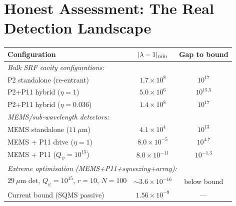 \documentclass[11pt,twocolumn]{article}
\newcommand{\lam}{\lambda}
\newcommand{\ee}[1]{\times 10^{#1}}
\newcommand{\Qpsi}{Q_\psi}
\theoremstyle{definition}
\theoremstyle{remark}
\begin{document}
\section{Honest Assessment: The Real Detection Landscape}
\label{sec:honest}

\begin{tcolorbox}[colback=blue!5!white, colframe=blue!50!black,
  title=\textbf{Summary: P2 Detection Capabilities vs.\ Current Bound}]

\begin{center}
\renewcommand{\arraystretch}{1.3}
\begin{tabular}{@{}p{4cm}cc@{}}
\toprule
Configuration & $|\lam-1|_{\rm min}$ & Gap to bound \\
\midrule
\multicolumn{3}{l}{\textit{Bulk SRF cavity configurations:}} \\
P2 standalone (re-entrant) & $1.7\ee{8}$ & $10^{17}$ \\
P2+P11 hybrid ($\eta=1$) & $5.0\ee{6}$ & $10^{15.5}$ \\
P2+P11 hybrid ($\eta=0.036$) & $1.4\ee{8}$ & $10^{17}$ \\
\midrule
\multicolumn{3}{l}{\textit{MEMS/sub-wavelength detectors:}} \\
MEMS standalone ($11~\mu$m) & $4.1\ee{4}$ & $10^{13}$ \\
MEMS + P11 drive ($\eta=1$) & $8.0\ee{-5}$ & $10^{4.7}$ \\
MEMS + P11 ($\Qpsi=10^{15}$) & $8.0\ee{-11}$ & $10^{-1.3}$ \\
\midrule
\multicolumn{3}{l}{\textit{Extreme optimisation (MEMS+P11+squeezing+array):}} \\
$29~\mu$m det, $\Qpsi=10^{15}$,
$r=10$, $N=100$ & $\sim 3.6\ee{-16}$ & below bound \\
\midrule
Current bound (SQMS passive) & $1.56\ee{-9}$ & --- \\
\bottomrule
\end{tabular}
\end{center}


\end{tcolorbox}
\end{document}
